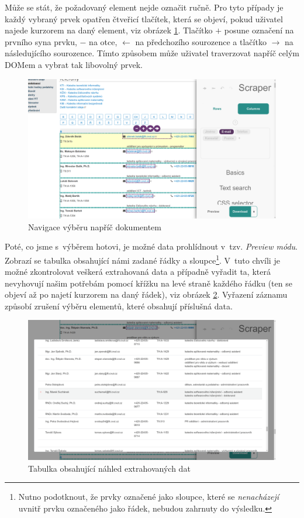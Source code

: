 \documentclass[thesis=B,czech]{FITthesis}[2012/06/26]
\begin{document}
\newpage
Může se stát, že požadovaný element nejde označit ručně. Pro tyto případy je každý vybraný prvek opatřen čtveřicí tlačítek, která se objeví, pokud uživatel najede kurzorem na daný element, viz obrázek \ref{fig:scraper_dom_navigation}. Tlačítko \textsf{$+$} posune označení na prvního syna prvku, \textsf{$-$} na otce, \textsf{$\leftarrow$} na předchozího sourozence a tlačítko \textsf{$\rightarrow$} na následujícího sourozence. Tímto způsobem může uživatel traverzovat napříč celým DOMem a vybrat tak libovolný prvek.
\begin{figure}
	\includegraphics[width=\linewidth]{images/Scraper_dom_navigation.png}
	\caption{Navigace výběru napříč dokumentem}
	\label{fig:scraper_dom_navigation}
\end{figure}

Poté, co jsme s~výběrem hotovi, je možné data prohlídnout v~tzv. \textit{Preview módu}. Zobrazí se tabulka obsahující námi zadané řádky a sloupce\footnote{Nutno podotknout, že prvky označené jako sloupce, které se \emph{nenacházejí} uvnitř prvku označeného jako řádek, nebudou zahrnuty do výsledku.}. V~tuto chvíli je možné zkontrolovat veškerá extrahovaná data a případně vyřadit ta, která nevyhovují našim potřebám pomocí křížku na levé straně každého řádku (ten se objeví až po najetí kurzorem na daný řádek), viz obrázek \ref{fig:scraper_preview_mode}. Vyřazení záznamu způsobí zrušení výběru elementů, které obsahují příslušná data.
\begin{figure}
	\includegraphics[width=\linewidth]{images/Scraper_preview_mode.png}
	\caption{Tabulka obsahující náhled extrahovaných dat}
	\label{fig:scraper_preview_mode}
\end{figure}
\end{document}
